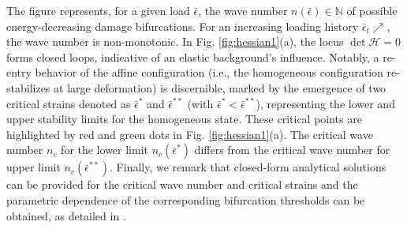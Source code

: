 The figure represents, for a given load $\bar \epsilon$, the wave number $n(\bar \epsilon)\in \mathbb N$ of possible energy-decreasing damage bifurcations. For an increasing loading history $\bar \epsilon_t\nearrow$, the wave number is non-monotonic.
In Fig. \ref{fig:hessian1}(a), the locus $\det \mathcal H=0$ forms closed loops, indicative of an elastic background's influence. Notably, a re-entry behavior of the affine configuration  (i.e., the homogeneous configuration re-stabilizes at large deformation) is discernible, marked by the emergence of two critical strains denoted as $\bar\epsilon^*$ and $\bar\epsilon^{**}$ (with $\bar\epsilon^* < \bar\epsilon^{**}$), representing the lower and upper stability limits for the homogeneous state. These critical points are highlighted by red and green dots in Fig. \ref{fig:hessian1}(a). The critical wave number $n_c$ for the lower limit $n_c(\bar{\epsilon}^*)$    differs from the critical wave number for  upper limit $n_c(\bar{\epsilon}^{**})$. Finally, we remark that closed-form analytical solutions can be provided for the critical wave number and critical strains and the parametric dependence of the corresponding bifurcation thresholds can be obtained, as detailed in \cite{Salman2021-mn}.

